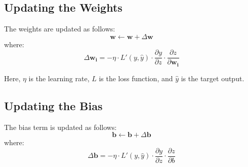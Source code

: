 \documentclass{article}
\begin{document}
\subsection{Updating the Weights}
The weights are updated as follows:
\[
\mathbf{w} \leftarrow \mathbf{w} + \Delta \mathbf{w}
\]
where:
\[
	\Delta \mathbf{w_i} = -\eta \cdot L'(y, \hat{y}) \cdot \frac{\partial y}{\partial z} \cdot \frac{\partial z}{\partial \mathbf{w_i}}
\]

Here, $\eta$ is the learning rate, $L$ is the loss function, and $\hat{y}$ is the target output.

\subsection{Updating the Bias}
The bias term is updated as follows:
\[
\mathbf{b} \leftarrow \mathbf{b} + \Delta \mathbf{b}
\]
where:
\[
	\Delta \mathbf{b} = -\eta \cdot L'(y, \hat{y}) \cdot \frac{\partial y}{\partial z} \cdot \frac{\partial z}{\partial b}
\]
\end{document}
